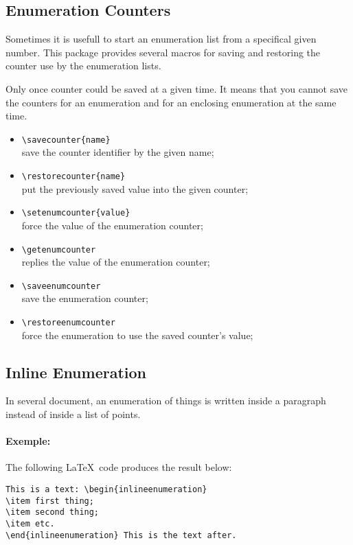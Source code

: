 \documentclass[book]{upmethodology-document}
\begin{document}
\subsection{Enumeration Counters}

Sometimes it is usefull to start an enumeration list from a specifical given number. This package provides several macros for saving and restoring the counter use by the enumeration lists.

\begin{upmcaution}
Only once counter could be saved at a given time.
It means that you cannot save the counters for an enumeration and for an enclosing enumeration at the same time.
\end{upmcaution}

\begin{itemize}
\item \texttt{{\textbackslash}savecounter\{name\}} \\
	save the counter identifier by the given name;
\item \texttt{{\textbackslash}restorecounter\{name\}} \\
	put the previously saved value into the given counter;
\item \texttt{{\textbackslash}setenumcounter\{value\}} \\
	force the value of the enumeration counter;
\item \texttt{{\textbackslash}getenumcounter} \\
	replies the value of the enumeration counter;
\item \texttt{{\textbackslash}saveenumcounter} \\
	save the enumeration counter;
\item \texttt{{\textbackslash}restoreenumcounter} \\
	force the enumeration to use the saved counter's value;
\end{itemize}

\subsection{Inline Enumeration}

In several document, an enumeration of things is written inside a paragraph instead of inside a list of points.

\paragraph{Exemple:} The following \LaTeX~code produces the result below:
\begin{verbatim}
This is a text: \begin{inlineenumeration}
\item first thing;
\item second thing;
\item etc.
\end{inlineenumeration} This is the text after.
\end{verbatim}
\end{document}
